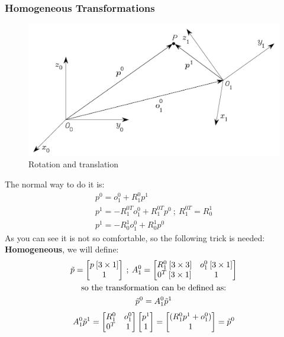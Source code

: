 \documentclass{article}
\begin{document}
    \subsubsection{Homogeneous Transformations}
    \begin{figure}[h!]
    \centering
    \includegraphics[scale=0.9]{homogenTr.png}
    \caption{Rotation and translation}
    \label{fig:sr}
    \end{figure}
    The normal way to do it is:
    \begin{gather*}
        p^0 = o^0_1+R^0_1p^1\\
        p^1 = -R^{0T}_1o^0_1+R^{0T}_1p^0 \:;\: R^{0T}_1 = R^1_0\\
        p^1 = -R^1_0o^0_1+R^1_0p^0
    \end{gather*}
    As you can see it is not so comfortable, so the following trick is needed:\\
    \textbf{Homogeneous}, we will define:
    \begin{gather*}
        \Tilde{p} = \begin{bmatrix}
        p\:[3\times1]\\ 1
        \end{bmatrix} \:;\:
        A^0_1 = \begin{bmatrix}
        R^0_1\:[3\times3] & o^0_1\:[3\times1] \\
        0^T \: [3\times1] & 1
        \end{bmatrix}\\
        \textrm{so the transformation can be defined as:}\\
        \Tilde{p}^0= A^0_1\Tilde{p}^1
    \end{gather*}
    \begin{gather*}
        A^0_1\Tilde{p}^1 = \begin{bmatrix}
        R^0_1 & o^0_1 \\
        0^T &1
        \end{bmatrix}
        \begin{bmatrix}
        p^1 \\ 1
        \end{bmatrix} =
        \begin{bmatrix}
        (R^0_1p^1+o^0_1) \\
        1
        \end{bmatrix} = \Tilde{p}^0
    \end{gather*}
\end{document}
